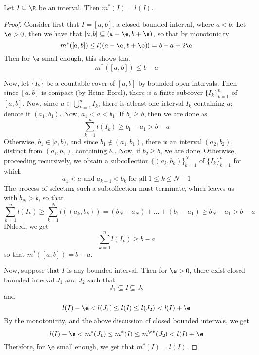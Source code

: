 \begin{lemma}\label{8.2.4}
    Let $I \subseteq \R$ be an interval. Then  $m^\ast(I)=l(I)$.
\end{lemma}
\begin{proof}
    Consider first that $I=[a,b]$, a closed bounded interval, where $a<b$. Let
    $\e>0$, then we have that  $[a,b] \subseteq (a-\e,b+\e)$, so that by
    monotonicity
    \begin{equation*}
        m^\ast([a,b]) \leq l((a-\e,b+\e))=b-a+2\e
    \end{equation*}
    Then for $\e$ small enough, this shows that
    \begin{equation*}
        m^\ast([a,b]) \leq b-a
    \end{equation*}

    Now, let $\{I_k\}$ be a countable cover of $[a,b]$ by bounded open
    intervals. Then since $[a,b]$ is compact (by Heine-Borel), there is a finite
    subcover $\{I_k\}_{k=1}^n$ of $[a,b]$. Now, since $a \in
    \bigcup_{k=1}^n{I_k}$, there is atleast one interval $I_k$ containing $a$;
    denote it $ (a_1,b_1)$. Now, $a_1<a<b_1$. If $b_1 \geq b$, then we are done
    as
    \begin{equation*}
        \sum_{k=1}^n{l(I_k)} \geq b_1-a_1>b-a
    \end{equation*}
    Otherwise, $b_1 \in [a,b)$, and since $b_1 \notin (a_1,b_1)$, there is an
    interval $(a_2,b_2)$, distinct from $(a_1,b_1)$, containing $b_1$. Now, if
    $b_2 \geq b$, we are done. Otherwise, proceeding recursively, we obtain a
    subcollection $\{(a_k,b_k)\}_{k=1}^N$ of $\{I_k\}_{k=1}^n$ for which
    \begin{equation*}
        a_1<a \text{ and } a_{k+1}<b_k \text{ for all } 1 \leq k \leq N-1
    \end{equation*}
    The process of selecting such a subcollection must terminate, which leaves
    us with $b_N>b$, so that
    \begin{equation*}
        \sum_{k=1}^n{l(I_k)} \geq \sum_{k=1}^N{l((a_k,b_k))}=
        (b_N-a_N)+\dots+(b_1-a_1) \geq b_N-a_1>b-a
    \end{equation*}
    INdeed, we get
    \begin{equation*}
        \sum_{k=1}^n{l(I_k)} \geq b-a
    \end{equation*}
    so that $m^\ast([a,b])=b-a$.

    Now, suppose that $I$ is any bounded interval. Then for  $\e>0$, there
    exist closed bounded interval $J_1$ and $J_2$ such that
    \begin{equation*}
        J_1 \subseteq I \subseteq J_2
    \end{equation*}
    and
    \begin{equation*}
        l(I)-\e<l(J_1) \leq l(I) \leq l(J_2)<l(I)+\e
    \end{equation*}
    By the monotonicity, and the above discussion of closed bounded intervals,
    we get
    \begin{equation*}
        l(I)-\e<m^\ast(J_1) \leq m^\ast(I) \leq m^\at(J_2)<l(I)+\e
    \end{equation*}
    Therefore, for $\e$ small enough, we get that $m^\ast(I)=l(I)$.


\end{proof}

